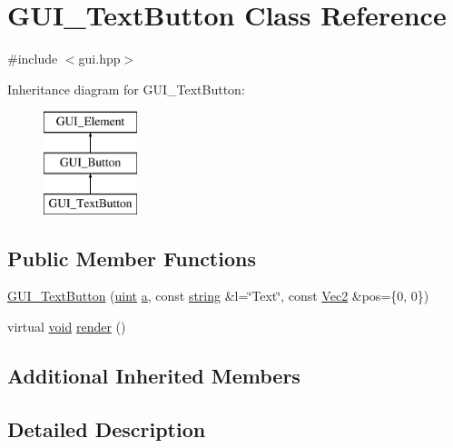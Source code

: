 \hypertarget{class_g_u_i___text_button}{\section{G\-U\-I\-\_\-\-Text\-Button Class Reference}
\label{class_g_u_i___text_button}
}


{\ttfamily \#include $<$gui.\-hpp$>$}

Inheritance diagram for G\-U\-I\-\_\-\-Text\-Button\-:\begin{figure}[H]
\begin{center}
\leavevmode
\includegraphics[height=3.000000cm]{class_g_u_i___text_button}
\end{center}
\end{figure}
\subsection*{Public Member Functions}
\begin{DoxyCompactItemize}
\item 
\hyperlink{class_g_u_i___text_button_a4d3e179027a47e734d4cb74676d727de}{G\-U\-I\-\_\-\-Text\-Button} (\hyperlink{common_8hpp_a69aa29b598b851b0640aa225a9e5d61d}{uint} \hyperlink{_s_d_l__opengl__glext_8h_a3309789fc188587d666cda5ece79cf82}{a}, const \hyperlink{_s_d_l__opengl__glext_8h_ae84541b4f3d8e1ea24ec0f466a8c568b}{string} \&l=\char`\"{}Text\char`\"{}, const \hyperlink{class_vec2}{Vec2} \&pos=\{0, 0\})
\item 
virtual \hyperlink{_s_d_l__opengles2__gl2ext_8h_ae5d8fa23ad07c48bb609509eae494c95}{void} \hyperlink{class_g_u_i___text_button_a160fa50b3f12b0003f8835c04cf5b373}{render} ()
\end{DoxyCompactItemize}
\subsection*{Additional Inherited Members}


\subsection{Detailed Description}


